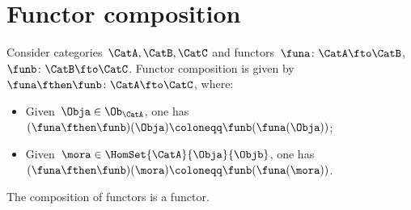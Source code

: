 
\section{Functor composition}

\begin{ctdefinition}
    \label{def:functor_composition}
    Consider categories~$\CatA,\CatB,\CatC$ and functors~$\funa\colon \CatA\fto \CatB$,~$\funb \colon \CatB\fto \CatC$.
    Functor composition is given by~$\funa\fthen \funb\colon \CatA \fto \CatC$, where:
    \begin{itemize}
        \item Given~$\Obja\in \Ob_\CatA$, one has~$(\funa\fthen \funb)(\Obja)\coloneqq\funb(\funa(\Obja))$;
        \item Given~$\mora \in \HomSet{\CatA}{\Obja}{\Objb}$, one has~$(\funa\fthen \funb)(\mora)\coloneqq \funb(\funa(\mora))$.
    \end{itemize}
\end{ctdefinition}

\begin{lemma}
    \label{lem:functors_compose}
    The composition of functors is a functor.
\end{lemma}

